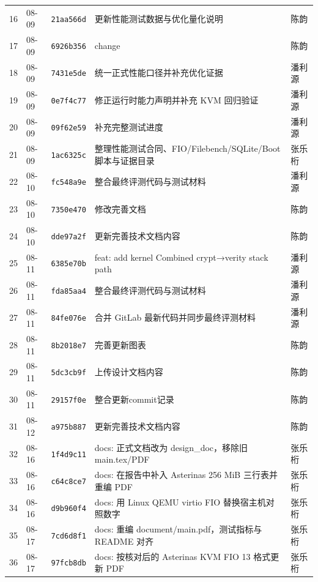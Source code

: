 \begin{table}[H]
\begin{tabular}{p{}p{}p{}p{}p{}}
        16 & 08-09 & \texttt{21aa566d} & 更新性能测试数据与优化量化说明 & 陈韵 \\
        17 & 08-09 & \texttt{6926b356} & change & 陈韵 \\
        18 & 08-09 & \texttt{7431e5de} & 统一正式性能口径并补充优化证据 & 潘利源 \\
        19 & 08-09 & \texttt{0e7f4c77} & 修正运行时能力声明并补充 KVM 回归验证 & 潘利源 \\
        20 & 08-09 & \texttt{09f62e59} & 补充完整测试进度 & 潘利源 \\
        21 & 08-09 & \texttt{1ac6325c} & 整理性能测试合同、FIO/Filebench/SQLite/Boot 脚本与证据目录 & 张乐桁 \\
        22 & 08-10 & \texttt{fc548a9e} & 整合最终评测代码与测试材料 & 潘利源 \\
        23 & 08-10 & \texttt{7350e470} & 修改完善文档 & 陈韵 \\
        24 & 08-10 & \texttt{dde97a2f} & 更新完善技术文档内容 & 陈韵 \\
        25 & 08-11 & \texttt{6385e70b} & feat: add kernel Combined crypt→verity stack path & 潘利源 \\
        26 & 08-11 & \texttt{fda85aa4} & 整合最终评测代码与测试材料 & 潘利源 \\
        27 & 08-11 & \texttt{84fe076e} & 合并 GitLab 最新代码并同步最终评测材料 & 潘利源 \\
        28 & 08-11 & \texttt{8b2018e7} & 完善更新图表 & 陈韵 \\
        29 & 08-11 & \texttt{5dc3cb9f} & 上传设计文档内容 & 陈韵 \\
        30 & 08-11 & \texttt{29157f0e} & 整合更新commit记录 & 陈韵 \\
        31 & 08-12 & \texttt{a975b887} & 更新完善技术文档内容 & 陈韵 \\
        32 & 08-16 & \texttt{1f4d9c11} & docs: 正式文档改为 design\_doc，移除旧 main.tex/PDF & 张乐桁 \\
        33 & 08-16 & \texttt{c64c8ce7} & docs: 在报告中补入 Asterinas 256 MiB 三行表并重编 PDF & 张乐桁 \\
        34 & 08-16 & \texttt{d9b960f4} & docs: 用 Linux QEMU virtio FIO 替换宿主机对照数字 & 张乐桁 \\
        35 & 08-17 & \texttt{7cd6d8f1} & docs: 重编 document/main.pdf，测试指标与 README 对齐 & 张乐桁 \\
        36 & 08-17 & \texttt{97fcb8db} & docs: 按核对后的 Asterinas KVM FIO 13 格式更新 PDF & 张乐桁 \\

\end{tabular}
\end{table}
